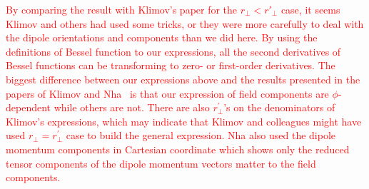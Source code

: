 \documentclass[]{report}
\begin{document}
\textcolor{red}{By comparing the result with Klimov's paper for the $ r\!_\perp<r'\!_\perp $ case, it seems Klimov and others had used some tricks, or they were more carefully to deal with the dipole orientations and components than we did here. By using the definitions of Bessel function to our expressions, all the second derivatives of Bessel functions can be transforming to zero- or first-order derivatives. The biggest difference between our expressions above and the results presented in the papers of Klimov and Nha~\cite{Nha1997} is that our expression of field components are $\phi$-dependent while others are not. There are also $r\!_\perp^{\prime}$'s on the denominators of Klimov's expressions, which may indicate that Klimov and colleagues might have used $r\!_\perp=r\!_\perp^{\prime}$ case to build the general expression. Nha also used the dipole momentum components in Cartesian coordinate which shows only the reduced tensor components of the dipole momentum vectors matter to the field components.}
\end{document}

